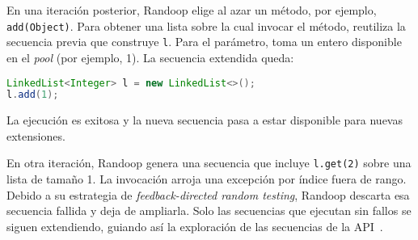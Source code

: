 En una iteración posterior, Randoop elige al azar un método, por ejemplo,
\texttt{add(Object)}. Para obtener una lista sobre la cual invocar el
método, reutiliza la secuencia previa que construye \texttt{l}. Para el
parámetro, toma un entero disponible en el \emph{pool} (por ejemplo, 1).
La secuencia extendida queda:
\\
\begin{lstlisting}[language=Java,basicstyle=\ttfamily\small,columns=fullflexible,keepspaces=true]
LinkedList<Integer> l = new LinkedList<>();
l.add(1);
\end{lstlisting}

La ejecución es exitosa y la nueva secuencia pasa a estar disponible para
nuevas extensiones.

En otra iteración, Randoop genera una secuencia que incluye
\texttt{l.get(2)} sobre una lista de tamaño 1. La invocación arroja una
excepción por índice fuera de rango. Debido a su estrategia de
\emph{feedback-directed random testing}, Randoop descarta esa secuencia
fallida y deja de ampliarla. Solo las secuencias que ejecutan sin fallos
se siguen extendiendo, guiando así la exploración de las secuencias de la
API~\cite{Pacheco07,Pacheco08}.




%




